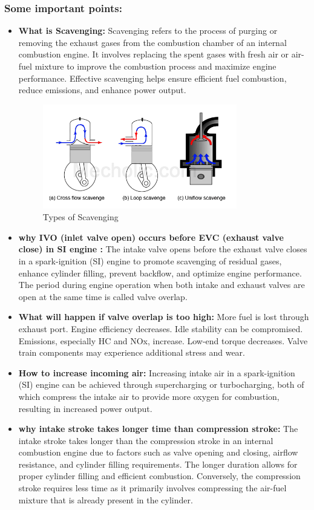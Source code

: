 \documentclass{article}
\begin{document}
\subsubsection*{Some important points:}
\begin{itemize}
	\item \textbf{What is Scavenging:} Scavenging refers to the process of purging or removing the exhaust gases from the combustion chamber of an internal combustion engine. It involves replacing the spent gases with fresh air or air-fuel mixture to improve the combustion process and maximize engine performance. Effective scavenging helps ensure efficient fuel combustion, reduce emissions, and enhance power output.
	\begin{figure}
		\centering
		\includegraphics[width=0.8\textwidth]{img/scavenging.png}
		\caption{Types of Scavenging}
		\label{fig:scavenging}
	\end{figure}

	\item \textbf{why IVO (inlet valve open) occurs before EVC (exhaust valve close) in SI engine :} The intake valve opens before the exhaust valve closes in a spark-ignition (SI) engine to promote scavenging of residual gases, enhance cylinder filling, prevent backflow, and optimize engine performance. The period during engine operation when both intake and exhaust valves are open at the same time is called valve overlap. 
	\item \textbf{What will happen if valve overlap is too high:} More fuel is lost through exhaust port. Engine efficiency decreases. Idle stability can be compromised.
	Emissions, especially HC and NOx, increase.
	Low-end torque decreases. Valve train components may experience additional stress and wear.
	
	\item \textbf{How to increase incoming air:} Increasing intake air in a spark-ignition (SI) engine can be achieved through supercharging or turbocharging, both of which compress the intake air to provide more oxygen for combustion, resulting in increased power output.
	\item \textbf{why intake stroke takes longer time than compression stroke:} The intake stroke takes longer than the compression stroke in an internal combustion engine due to factors such as valve opening and closing, airflow resistance, and cylinder filling requirements. The longer duration allows for proper cylinder filling and efficient combustion. Conversely, the compression stroke requires less time as it primarily involves compressing the air-fuel mixture that is already present in the cylinder.


\end{itemize}
\end{document}

